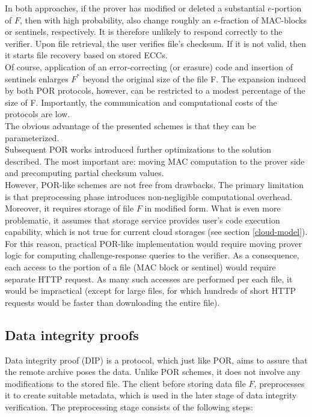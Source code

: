 In both approaches, if the prover has modified or deleted a substantial 
$e$-portion of $F$, then with high probability, also change roughly an
$e$-fraction of MAC-blocks or sentinels, respectively. It is therefore unlikely
to respond correctly to the verifier. Upon file retrieval, the user verifies
file's checksum. If it is not valid, then it starts file recovery based on
stored ECCs.\\

Of course, application of an error-correcting (or erasure) code and insertion
of sentinels enlarges $F^{*}$ beyond the original size of the file F. The
expansion induced by both POR protocols, however, can be restricted to a modest
percentage of the size of F. Importantly, the communication and computational
costs of the protocols are low.\\

The obvious advantage of the presented schemes is that they can be
parameterized.\\

Subsequent POR works \cite{compact-por, por2, hail, venus, iris} introduced
further optimizations to the solution described. The most important are:
moving MAC computation to the prover side and precomputing partial checksum
values.\\

However, POR-like schemes are not free from drawbacks. The primary limitation
is that preprocessing phase introduces non-negligible computational overhead.
Moreover, it requires storage of file $F$ in modified form. What is even more
problematic, it assumes that storage service provides user's code execution
capability, which is not true for current cloud storages 
(see section \ref{cloud-model}). For this reason, practical POR-like
implementation would require moving prover logic for computing 
challenge-response queries to the verifier. As a consequence, each access to
the portion of a file (MAC block or sentinel) would require separate HTTP
request. As many such accesses are performed per each file, it would be
impractical (except for large files, for which hundreds of short HTTP requests
would be faster than downloading the entire file).

		\subsection{Data integrity proofs}
Data integrity proof (DIP) \cite{dip} is a protocol, which just like POR, aims
to assure that the remote archive poses the data. Unlike POR schemes, it does
not involve any modifications to the stored file. The client before storing
data file $F$, preprocesses it to create suitable metadata, which is used in
the later stage of data integrity verification. The preprocessing stage
consists of the following steps:

